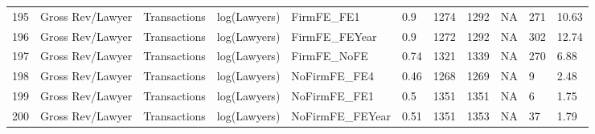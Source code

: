 \documentclass{article}
\begin{document}
\begin{table}[H]
\begin{tabular}{rllllllllll}
  195 & Gross Rev/Lawyer & Transactions & log(Lawyers) & FirmFE\_FE1 & 0.9 & 1274 & 1292 & NA & 271 & 10.63 \\ 
  196 & Gross Rev/Lawyer & Transactions & log(Lawyers) & FirmFE\_FEYear & 0.9 & 1272 & 1292 & NA & 302 & 12.74 \\ 
  197 & Gross Rev/Lawyer & Transactions & log(Lawyers) & FirmFE\_NoFE & 0.74 & 1321 & 1339 & NA & 270 & 6.88 \\ 
  198 & Gross Rev/Lawyer & Transactions & log(Lawyers) & NoFirmFE\_FE4 & 0.46 & 1268 & 1269 & NA & 9 & 2.48 \\ 
  199 & Gross Rev/Lawyer & Transactions & log(Lawyers) & NoFirmFE\_FE1 & 0.5 & 1351 & 1351 & NA & 6 & 1.75 \\ 
  200 & Gross Rev/Lawyer & Transactions & log(Lawyers) & NoFirmFE\_FEYear & 0.51 & 1351 & 1353 & NA & 37 & 1.79 \\ 
   \hline
\end{tabular}
\end{table}
\end{document}
